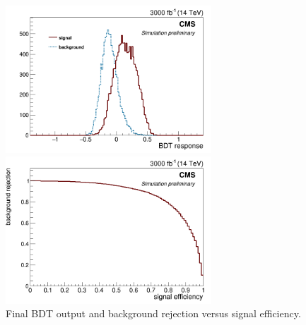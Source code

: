 \documentclass[10pt,a4paper]{article}
\newcommand{\ww}{7.7cm} %
\begin{document}
\begin{figure}[h] 
	
    \begin{minipage}[h!]{\ww}
      \centering
      \includegraphics[width=\ww]{figs/BDTBoost1_everything4CleanUp.png}
    \end{minipage}
    \begin{minipage}[h!]{\ww}
      \centering
      \includegraphics[width=\ww]{figs/BrejvsSeffs_everything4CleanUp_BDTBoost1.png}
    \end{minipage}
  \caption{Final BDT output and background rejection versus signal efficiency.} \label{BDT}

\end{figure}
\end{document}
